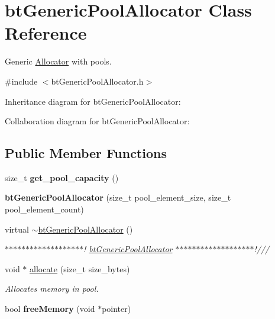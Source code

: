 \hypertarget{classbt_generic_pool_allocator}{\section{bt\+Generic\+Pool\+Allocator Class Reference}
\label{classbt_generic_pool_allocator}
}


Generic \hyperlink{class_allocator}{Allocator} with pools.  




{\ttfamily \#include $<$bt\+Generic\+Pool\+Allocator.\+h$>$}



Inheritance diagram for bt\+Generic\+Pool\+Allocator\+:


Collaboration diagram for bt\+Generic\+Pool\+Allocator\+:
\subsection*{Public Member Functions}
\begin{DoxyCompactItemize}
\item 
\hypertarget{classbt_generic_pool_allocator_ab34f82358157fb84815facf548a7ed44}{size\+\_\+t {\bfseries get\+\_\+pool\+\_\+capacity} ()}\label{classbt_generic_pool_allocator_ab34f82358157fb84815facf548a7ed44}

\item 
\hypertarget{classbt_generic_pool_allocator_abf2f5fb4394dff12a92005fc579f866e}{{\bfseries bt\+Generic\+Pool\+Allocator} (size\+\_\+t pool\+\_\+element\+\_\+size, size\+\_\+t pool\+\_\+element\+\_\+count)}\label{classbt_generic_pool_allocator_abf2f5fb4394dff12a92005fc579f866e}

\item 
\hypertarget{classbt_generic_pool_allocator_a3d92133ad713c674e5102bfd2ca2d66a}{virtual \hyperlink{classbt_generic_pool_allocator_a3d92133ad713c674e5102bfd2ca2d66a}{$\sim$bt\+Generic\+Pool\+Allocator} ()}\label{classbt_generic_pool_allocator_a3d92133ad713c674e5102bfd2ca2d66a}

\begin{DoxyCompactList}\small\item\em $\ast$$\ast$$\ast$$\ast$$\ast$$\ast$$\ast$$\ast$$\ast$$\ast$$\ast$$\ast$$\ast$$\ast$$\ast$$\ast$$\ast$$\ast$$\ast$! \hyperlink{classbt_generic_pool_allocator}{bt\+Generic\+Pool\+Allocator} $\ast$$\ast$$\ast$$\ast$$\ast$$\ast$$\ast$$\ast$$\ast$$\ast$$\ast$$\ast$$\ast$$\ast$$\ast$$\ast$$\ast$$\ast$$\ast$!/// \end{DoxyCompactList}\item 
void $\ast$ \hyperlink{classbt_generic_pool_allocator_ae07307fd61ffa9ce47b5f198b87d17e1}{allocate} (size\+\_\+t size\+\_\+bytes)
\begin{DoxyCompactList}\small\item\em Allocates memory in pool. \end{DoxyCompactList}\item 
\hypertarget{classbt_generic_pool_allocator_a6904f973aef630798a87f0e6dd37e93c}{bool {\bfseries free\+Memory} (void $\ast$pointer)}\label{classbt_generic_pool_allocator_a6904f973aef630798a87f0e6dd37e93c}

\end{DoxyCompactItemize}
